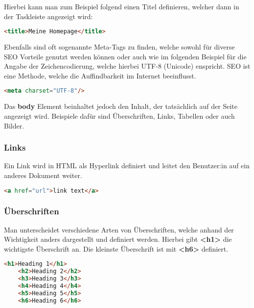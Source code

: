 Hierbei kann man zum Beispiel folgend einen Titel definieren, welcher dann in der Taskleiste angezeigt wird:

\begin{lstlisting}[language=html]
    <title>Meine Homepage</title>
\end{lstlisting}

Ebenfalls sind oft sogenannte Meta-Tags zu finden, welche sowohl für diverse SEO Vorteile genutzt werden können oder auch wie im folgenden Beispiel für die Angabe der Zeichencodierung, welche hierbei UTF-8 (Unicode) enspricht.
SEO ist eine Methode, welche die Auffindbarkeit im Internet beeinflusst.

\begin{lstlisting}[language=html]
    <meta charset="UTF-8"/>
\end{lstlisting}

Das \textbf{body} Element beinhaltet jedoch den Inhalt, der tatsächlich auf der Seite angezeigt wird. Beispiele dafür sind Überschriften, Links, Tabellen oder auch Bilder.

\cite{frontend_web_html}

\subsubsection{Links}
Ein Link wird in HTML als Hyperlink definiert und leitet den Benutzer:in auf ein anderes Dokument weiter.

\begin{lstlisting}[language=html]
    <a href="url">link text</a>
\end{lstlisting}

\cite{frontend_web_html_links}

\subsubsection{Überschriften}
Man unterscheidet verschiedene Arten von Überschriften, welche anhand der Wichtigkeit anders dargestellt und definiert werden. Hierbei gibt \textbf{<h1>} die wichtigste Überschrift an. Die kleinste Überschrift ist mit \textbf{<h6>} definiert.

\begin{lstlisting}[language=html, caption=HTML Headings]
    <h1>Heading 1</h1>
    <h2>Heading 2</h2>
    <h3>Heading 3</h3>
    <h4>Heading 4</h4>
    <h5>Heading 5</h5>
    <h6>Heading 6</h6>
\end{lstlisting}

\cite{frontend_web_html_überschriften}

